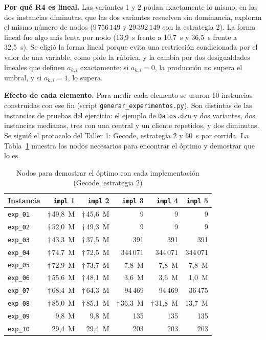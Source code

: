 \textbf{Por qué R4 es lineal.} Las variantes 1 y 2 podan exactamente lo mismo: en las dos instancias diminutas, que las dos variantes resuelven sin dominancia, exploran el mismo número de nodos ($9\,756\,149$ y $29\,392\,149$ con la estrategia 2). La forma lineal fue algo más lenta por nodo (13,9~s frente a 10,7~s y 36,5~s frente a 32,5~s). Se eligió la forma lineal porque evita una restricción condicionada por el valor de una variable, como pide la rúbrica, y la cambia por dos desigualdades lineales que definen $a_{k,i}$ exactamente: si $a_{k,i} = 0$, la producción no supera el umbral, y si $a_{k,i} = 1$, lo supera.

\textbf{Efecto de cada elemento.} Para medir cada elemento se usaron 10 instancias construidas con ese fin (script \texttt{generar\_experimentos.py}). Son distintas de las instancias de pruebas del ejercicio: el ejemplo de \texttt{Datos.dzn} y dos variantes, dos instancias medianas, tres con una central y un cliente repetidos, y dos diminutas. Se siguió el protocolo del Taller 1: Gecode, estrategia 2 y 60~s por corrida. La Tabla~\ref{tab:plantas-ablacion} muestra los nodos necesarios para encontrar el óptimo y demostrar que lo es.

\begin{table}[htbp]
    \caption{Nodos para demostrar el óptimo con cada implementación (Gecode, estrategia 2)}
    \label{tab:plantas-ablacion}
    \small
    \begin{tabular}{@{}lrrrrr@{}}
        \toprule
        Instancia & \texttt{impl} 1 & \texttt{impl} 2 & \texttt{impl} 3 & \texttt{impl} 4 & \texttt{impl} 5 \\
        \midrule
        \texttt{exp\_01} & $\dagger$\,49,8~M & $\dagger$\,45,6~M & 9 & 9 & 9 \\
        \texttt{exp\_02} & $\dagger$\,52,0~M & $\dagger$\,49,3~M & 9 & 9 & 9 \\
        \texttt{exp\_03} & $\dagger$\,43,3~M & $\dagger$\,37,5~M & 391 & 391 & 391 \\
        \texttt{exp\_04} & $\dagger$\,74,7~M & $\dagger$\,72,5~M & 344\,071 & 344\,071 & 344\,071 \\
        \texttt{exp\_05} & $\dagger$\,72,9~M & $\dagger$\,73,7~M & 7,8~M & 7,8~M & 7,8~M \\
        \texttt{exp\_06} & $\dagger$\,55,6~M & $\dagger$\,48,1~M & 3,6~M & 3,6~M & 1,0~M \\
        \texttt{exp\_07} & $\dagger$\,68,4~M & $\dagger$\,64,3~M & 94\,469 & 94\,469 & 36\,475 \\
        \texttt{exp\_08} & $\dagger$\,85,0~M & $\dagger$\,85,1~M & $\dagger$\,36,3~M & $\dagger$\,31,8~M & 13,7~M \\
        \texttt{exp\_09} & 9,8~M & 9,8~M & 135 & 135 & 135 \\
        \texttt{exp\_10} & 29,4~M & 29,4~M & 203 & 203 & 203 \\
        \bottomrule
    \end{tabular}
\end{table}

